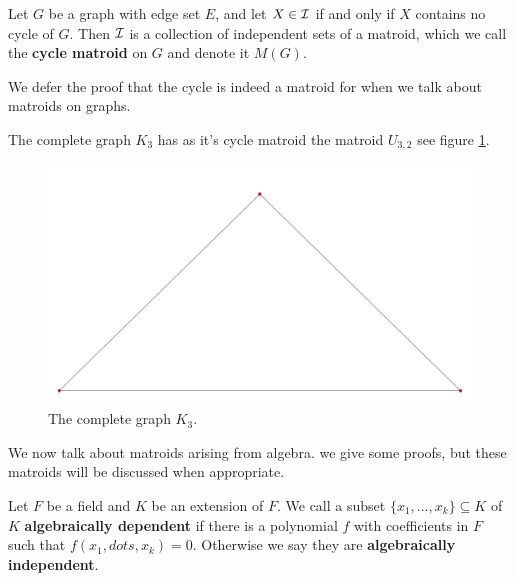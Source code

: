 \begin{definition}
    Let $G$ be a graph with edge set  $E$, and let  $X \in \mathcal{I}$ if and only if  $X$ contains no
    cycle of  $G$. Then  $\mathcal{I}$ is a collection of independent sets of a matroid, which we call the
    \textbf {cycle matroid} on $G$ and denote it  $M(G)$.		
\end{definition}

We defer the proof that the cycle is indeed a matroid for when we talk about matroids on graphs.

\begin{example}
    The complete graph $K_3$ has as it's cycle matroid the matroid  $U_{3,2}$ see figure
    \ref{fig:1.1}.
    \begin{figure}
        \centering
        \includegraphics[scale = 0.3]{Figures/Chapter1/k3cyclemat.png}
        \caption{The complete graph $K_3$.}
        \label{fig:1.1}
    \end{figure}
\end{example} 

We now talk about matroids arising from algebra. we give some proofs, but these matroids will be
discussed when appropriate.

\begin{definition}
    Let $F$ be a field and  $K$ be an extension of $F$. We call a subset  $\{x_1, \dots, x_k\}
    \subseteq K$ of $K$ \textbf {algebraically dependent} if there is a polynomial $f$ with
    coefficients in  $F$ such that  $f(x_1, dots, x_k)=0$. Otherwise we say they are \textbf
    {algebraically independent}.
\end{definition}

